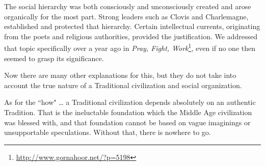 \begin{footnotesize}
\begin{sffamily}
The social hierarchy was both consciously and unconsciously created and arose organically for the most part. Strong leaders such as Clovis and Charlemagne, established and protected that hierarchy. Certain intellectual currents, originating from the poets and religious authorities, provided the justification. We addressed that topic specifically over a year ago in \textit{Pray, Fight, Work}\footnote{\url{http://www.gornahoor.net/?p=5198}}, even if no one then seemed to grasp its significance.

Now there are many other explanations for this, but they do not take into account the true nature of a Traditional civilization and social organization.

As for the ``how" … a Traditional civilization depends absolutely on an authentic Tradition. That is the ineluctable foundation which the Middle Age civilization was blessed with, and that foundation cannot be based on vague imaginings or unsupportable speculations. Without that, there is nowhere to go.


\end{sffamily}\end{footnotesize}
